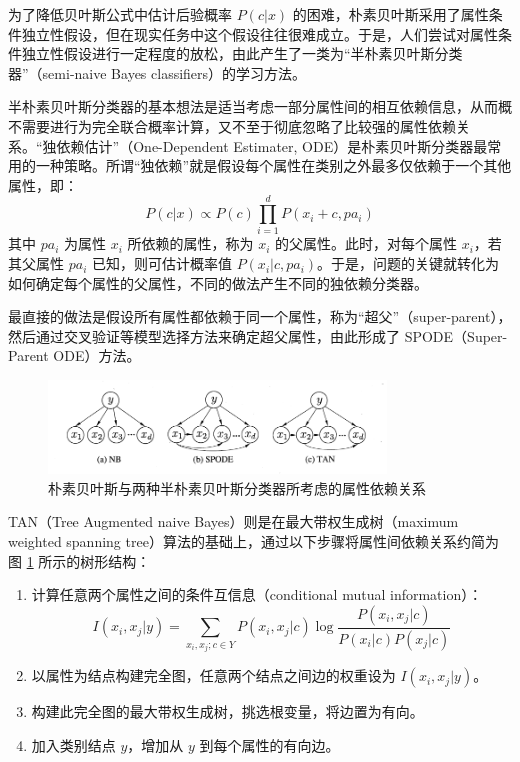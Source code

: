 \documentclass[12pt, a4paper]{article} %
\begin{document}
为了降低贝叶斯公式中估计后验概率 $P(c | x)$ 的困难，朴素贝叶斯采用了属性条件独立性假设，但在现实任务中这个假设往往很难成立。于是，人们尝试对属性条件独立性假设进行一定程度的放松，由此产生了一类为“半朴素贝叶斯分类器”（semi-naive Bayes classifiers）的学习方法。

半朴素贝叶斯分类器的基本想法是适当考虑一部分属性间的相互依赖信息，从而概不需要进行为完全联合概率计算，又不至于彻底忽略了比较强的属性依赖关系。“独依赖估计”（One-Dependent Estimater, ODE）是朴素贝叶斯分类器最常用的一种策略。所谓“独依赖”就是假设每个属性在类别之外最多仅依赖于一个其他属性，即：
\begin{equation*}
    \displaystyle P(c | x) \propto P(c) \displaystyle \prod_{i = 1}^{d} P(x_i + c, pa_i)
\end{equation*}
其中 $pa_i$ 为属性 $x_i$ 所依赖的属性，称为 $x_i$ 的父属性。此时，对每个属性 $x_i$，若其父属性 $pa_i$ 已知，则可估计概率值 $P(x_i | c, pa_i)$。于是，问题的关键就转化为如何确定每个属性的父属性，不同的做法产生不同的独依赖分类器。

最直接的做法是假设所有属性都依赖于同一个属性，称为“超父”（super-parent），然后通过交叉验证等模型选择方法来确定超父属性，由此形成了 SPODE（Super-Parent ODE）方法。

\begin{figure}[H]
    \centering
    \includegraphics[width=0.8\textwidth]{../img/7-1-朴素贝叶斯与两种半朴素贝叶斯分类器所考虑的属性依赖关系.png}
    \caption{朴素贝叶斯与两种半朴素贝叶斯分类器所考虑的属性依赖关系}
    \label{fig:朴素贝叶斯与两种半朴素贝叶斯分类器所考虑的属性依赖关系}
\end{figure}

TAN（Tree Augmented naive Bayes）则是在最大带权生成树（maximum weighted spanning tree）算法的基础上，通过以下步骤将属性间依赖关系约简为图 \ref{fig:朴素贝叶斯与两种半朴素贝叶斯分类器所考虑的属性依赖关系} 所示的树形结构：

\begin{enumerate}[\hspace*{2em} i.]
    \item 计算任意两个属性之间的条件互信息（conditional mutual information）：
    \begin{equation*}
        I(x_i, x_j | y) = \sum_{x_i, x_j; c \in Y} P(x_i, x_j | c) \log \frac{P(x_i, x_j | c)}{P(x_i | c)P(x_j | c)}
    \end{equation*}
    \item 以属性为结点构建完全图，任意两个结点之间边的权重设为 $I(x_i, x_j | y)$。
    \item 构建此完全图的最大带权生成树，挑选根变量，将边置为有向。
    \item 加入类别结点 $y$，增加从 $y$ 到每个属性的有向边。
\end{enumerate}
\end{document}
